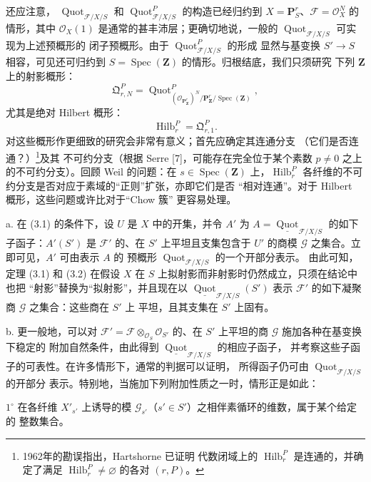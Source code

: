  还应注意，
$\operatorname{Quot}_{\mathcal F/X/S}$ 和
$\operatorname{Quot}^P_{\mathcal F/X/S}$ 的构造已经归约到
$X=\mathbf P^r_S$、$\mathcal F=\mathcal O_X^N$ 的情形，其中
$\mathcal O_X(1)$ 是通常的甚丰沛层；更确切地说，一般的
$\operatorname{Quot}_{\mathcal F/X/S}$ 可实现为上述预概形的
闭子预概形。由于 $\operatorname{Quot}^P_{\mathcal F/X/S}$ 的形成
显然与基变换 $S'\longrightarrow S$ 相容，可见还可归约到
$S=\operatorname{Spec}(\mathbf Z)$ 的情形。归根结底，我们只须研究
下列 $\mathbf Z$ 上的射影概形：
\[
\mathfrak Q^P_{r,N}=
\operatorname{Quot}^{P}_{(\mathcal O_{\mathbf P^r_{\mathbf Z}})^N/
\mathbf P^r_{\mathbf Z}/\operatorname{Spec}(\mathbf Z)},
\]
尤其是绝对 Hilbert 概形：
\[
\operatorname{Hilb}^P_r=\mathfrak Q^P_{r,1}.
\]
对这些概形作更细致的研究会非常有意义；首先应确定其连通分支
（它们是否连通？）\footnote{1962年的勘误指出，Hartshorne 已证明
代数闭域上的 $\operatorname{Hilb}^P_r$ 是连通的，并确定了满足
$\operatorname{Hilb}^P_r\neq\varnothing$ 的各对 $(r,P)$。}及其
不可约分支（根据 Serre [7]，可能存在完全位于某个素数 $p\neq0$
之上的不可约分支）。回顾 Weil 的问题：在
$s\in\operatorname{Spec}(\mathbf Z)$ 上，$\operatorname{Hilb}^P_r$
各纤维的不可约分支是否对应于素域的“正则”扩张，亦即它们是否
“相对连通”。对于 Hilbert 概形，这些问题或许比对于“Chow 簇”
更容易处理。


\noindent a. 在 (3.1) 的条件下，设 $U$ 是 $X$ 中的开集，并令 $A'$
为 $A=\underline{\operatorname{Quot}}_{\mathcal F/X/S}$ 的如下
子函子：$A'(S')$ 是 $\mathcal F'$ 的、在 $S'$ 上平坦且支集包含于
$U'$ 的商模 $\mathcal G$ 之集合。立即可见，$A'$ 可由表示 $A$ 的
预概形 $\operatorname{Quot}_{\mathcal F/X/S}$ 的一个开部分表示。
由此可知，定理 (3.1) 和 (3.2)
在假设 $X$ 在 $S$ 上拟射影而非射影时仍然成立，只须在结论中也把
“射影”替换为“拟射影”，并且现在以
$\underline{\operatorname{Quot}}_{\mathcal F/X/S}(S')$ 表示
$\mathcal F'$ 的如下凝聚商 $\mathcal G$ 之集合：这些商在 $S'$ 上
平坦，且其支集在 $S'$ 上固有。

\medskip
\noindent b. 更一般地，可以对
$\mathcal F'=\mathcal F\otimes_{\mathcal O_S}\mathcal O_{S'}$
的、在 $S'$ 上平坦的商 $\mathcal G$ 施加各种在基变换下稳定的
附加自然条件，由此得到
$\underline{\operatorname{Quot}}_{\mathcal F/X/S}$ 的相应子函子，
并考察这些子函子的可表性。在许多情形下，通常的判据可以证明，
所得函子仍可由 $\operatorname{Quot}_{\mathcal F/X/S}$ 的开部分
表示。特别地，当施加下列附加性质之一时，情形正是如此：

\smallskip
\noindent $1^\circ$ 在各纤维 $X'_{s'}$ 上诱导的模
$\mathcal G_{s'}$（$s'\in S'$）之相伴素循环的维数，属于某个给定的
整数集合。

